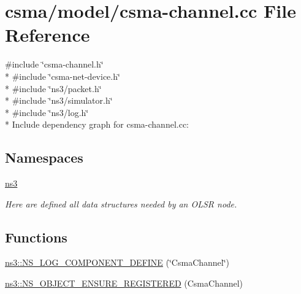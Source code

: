 \hypertarget{csma-channel_8cc}{}\section{csma/model/csma-\/channel.cc File Reference}
\label{csma-channel_8cc}
{\ttfamily \#include \char`\"{}csma-\/channel.\+h\char`\"{}}\\*
{\ttfamily \#include \char`\"{}csma-\/net-\/device.\+h\char`\"{}}\\*
{\ttfamily \#include \char`\"{}ns3/packet.\+h\char`\"{}}\\*
{\ttfamily \#include \char`\"{}ns3/simulator.\+h\char`\"{}}\\*
{\ttfamily \#include \char`\"{}ns3/log.\+h\char`\"{}}\\*
Include dependency graph for csma-\/channel.cc\+:
\subsection*{Namespaces}
\begin{DoxyCompactItemize}
\item 
 \hyperlink{namespacens3}{ns3}
\begin{DoxyCompactList}\small\item\em Here are defined all data structures needed by an O\+L\+SR node. \end{DoxyCompactList}\end{DoxyCompactItemize}
\subsection*{Functions}
\begin{DoxyCompactItemize}
\item 
\hyperlink{namespacens3_a4fa6b6c1a67c68ed86868341281cf502}{ns3\+::\+N\+S\+\_\+\+L\+O\+G\+\_\+\+C\+O\+M\+P\+O\+N\+E\+N\+T\+\_\+\+D\+E\+F\+I\+NE} (\char`\"{}Csma\+Channel\char`\"{})
\item 
\hyperlink{namespacens3_a74f91eb70e45ebf974bd2851a841f785}{ns3\+::\+N\+S\+\_\+\+O\+B\+J\+E\+C\+T\+\_\+\+E\+N\+S\+U\+R\+E\+\_\+\+R\+E\+G\+I\+S\+T\+E\+R\+ED} (Csma\+Channel)
\end{DoxyCompactItemize}
